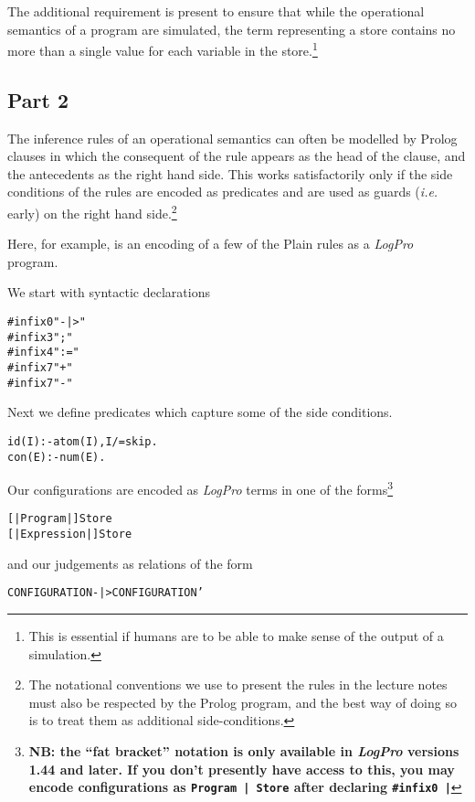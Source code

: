 \documentclass{article}
\def\LOGPRO{{\ttfamily\slshape LogPro}\xspace}
\newenvironment{smalltt}{\begin{small}\begin{alltt}}{\end{alltt}\end{small}}
\begin{document}
The additional requirement is present to ensure that while
the operational semantics of a program are simulated, the term
representing a store contains no more than a single value for
each variable in the store.\footnote{This is essential if humans
are to be able to make sense of the output of a simulation.}



\subsection*{Part 2} 

The inference rules of an operational semantics can often
be modelled by Prolog clauses in which the consequent of the
rule appears as the head of the clause, and the antecedents
as the right hand side. This works satisfactorily only if
the side conditions of the rules are encoded as predicates
and are used as guards ({\it i.e.\/} early) on the right hand
side.\footnote{The notational conventions we use to present
the rules in the lecture notes must also be respected by the
Prolog program, and the best way of doing so is to treat them
as additional side-conditions.}


Here, for example, is an encoding of a few of the Plain rules
as a \LOGPRO program. 

\newpage
We start with syntactic declarations
\begin{smalltt}
        #infix0 "-|>"
        #infix3 ";"
        #infix4 ":="
        #infix7 "+"
        #infix7 "-"
\end{smalltt}


Next we define predicates which capture some of the side conditions.
\begin{smalltt}
        id(I)                :- atom(I), I/=skip.
        con(E)               :- num(E).
\end{smalltt}

Our configurations are encoded as \LOGPRO terms in one of the forms\footnote{{\bf NB: the ``fat bracket'' notation is only available in
\LOGPRO versions 1.44 and later. If you don't presently have access to this,
you may encode configurations as {\tt Program | Store} after declaring 
{\tt \#infix0 |}}}
\begin{smalltt}
        [| Program    |] Store  
        [| Expression |] Store  
\end{smalltt}

and our judgements as relations of the form
\begin{smalltt}
        CONFIGURATION -|> CONFIGURATION'  
\end{smalltt}
\end{document}
